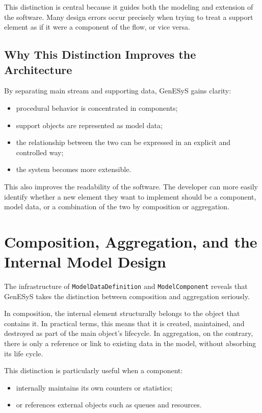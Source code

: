 This distinction is central because it guides both the modeling and extension of the software. Many design errors occur precisely when trying to treat a support element as if it were a component of the flow, or vice versa.

\subsection{Why This Distinction Improves the Architecture}
\label{subsec:cap8_por_que_distincao_melhora_arquitetura}

By separating main stream and supporting data, GenESyS gains clarity:
\begin{itemize}
 \item procedural behavior is concentrated in components;
 \item support objects are represented as model data;
 \item the relationship between the two can be expressed in an explicit and controlled way;
 \item the system becomes more extensible.
\end{itemize}

This also improves the readability of the software. The developer can more easily identify whether a new element they want to implement should be a component, model data, or a combination of the two by composition or aggregation.

\section{Composition, Aggregation, and the Internal Model Design}
\label{sec:cap8_composicao_agregacao}

The infrastructure of \texttt{ModelDataDefinition} and \texttt{ModelComponent} reveals that GenESyS takes the distinction between composition and aggregation seriously.

In composition, the internal element structurally belongs to the object that contains it. In practical terms, this means that it is created, maintained, and destroyed as part of the main object's lifecycle. In aggregation, on the contrary, there is only a reference or link to existing data in the model, without absorbing its life cycle.

This distinction is particularly useful when a component:
\begin{itemize}
 \item internally maintains its own counters or statistics;
 \item or references external objects such as queues and resources.
\end{itemize}

